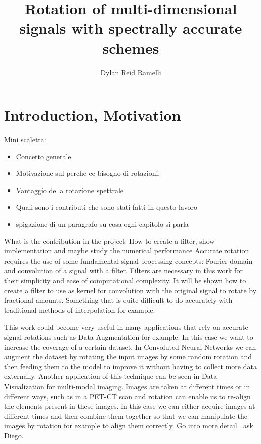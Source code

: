 \documentclass[]{usiinfbachelorproject}
\title{Rotation of multi-dimensional signals with spectrally accurate schemes}
\author{Dylan Reid Ramelli}
\begin{document}
	
	\maketitle
		
		
	\tableofcontents
	\newpage
	\section{Introduction, Motivation}\label{introduction}
	
	
	Mini scaletta:
	\begin{itemize}
		\item Concetto generale
		\item Motivazione sul perche ce bisogno di rotazioni.
		\item Vantaggio della rotazione spettrale
		\item Quali sono i contributi  che sono stati fatti in questo lavoro
		\item spigazione di un paragrafo su cosa ogni capitolo si parla
	\end{itemize}
	
	What is the contribution in the project: How to create a filter, show implementation and maybe study the numerical performance
	Accurate rotation requires the use of some fundamental signal processing concepts: Fourier domain and convolution of a signal with a filter. Filters are necessary in this work for their simplicity and ease of computational complexity. It will be shown how to create a filter to use as kernel for convolution with the original signal to rotate by fractional amounts. Something that is quite difficult to do accurately with traditional methods of interpolation for example. 
	
	
	This work could become very useful in many applications that rely on accurate signal rotations such as Data Augmentation for example. In this case we want to increase the coverage of a certain dataset. In Convoluted Neural Networks we can augment the dataset by rotating the input images by some random rotation and then feeding them to the model to improve it without having to collect more data externally.
	Another application of this technique can be seen in Data Visualization for multi-modal imaging. Images are taken at different times or in different ways, such as in a PET-CT scan and rotation can enable us to re-align the elements present in these images. In this case we can either acquire images at different times and then combine them together so that we can manipulate the images by rotation for example to align them correctly. Go into more detail.. ask Diego.
	
\end{document}
